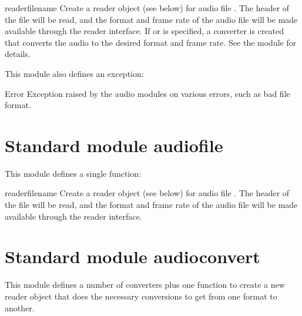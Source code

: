 \begin{funcdesc}{reader}{filename}
Create a reader object (see below) for audio file .  The
header of the file will be read, and the format and frame rate of the
audio file will be made available through the reader interface.  If
 or  is specified, a converter is created that
converts the audio to the desired format and frame rate.  See the
 module for details.
\end{funcdesc}

This module also defines an exception:

\begin{excdesc}{Error}
Exception raised by the audio modules on various errors, such as bad
file format.
\end{excdesc}

\section{Standard module audiofile}
\renewcommand{\indexsubitem}{(in module audiofile)}

This module defines a single function:

\begin{funcdesc}{reader}{filename}
Create a reader object (see below) for audio file .  The
header of the file will be read, and the format and frame rate of the
audio file will be made available through the reader interface.
\end{funcdesc}

\section{Standard module audioconvert}
\renewcommand{\indexsubitem}{(in module audioconvert)}

This module defines a number of converters plus one function to create
a new reader object that does the necessary conversions to get from
one format to another.

